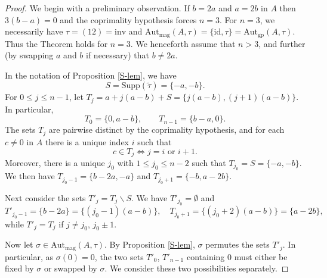 \documentclass[10pt,a4paper]{amsart}
\numberwithin{equation}{section}
\theoremstyle{definition}
\newcommand{\id}{\mathrm{id}}
\newcommand{\LRA}{\Leftrightarrow}
\newcommand{\inv}{\mathrm{inv}}
\newcommand{\Autgp}{\mathrm{Aut}_{\mathrm{gp}}}
\newcommand{\Autmag}{\mathrm{Aut}_\mathrm{mag}}
\newcommand{\ttau}{\tilde{\tau}}
\newcommand{\bs}{\backslash}
\newcommand{\Supp}{\mathrm{Supp}}
\begin{document}
\setcounter{section}{3}
\setcounter{equation}{1}
\setcounter{lemma}{2}
\begin{proof}

We begin with a preliminary observation. If $b=2a$ and $a=2b$ in $A$ then $3(b-a)=0$ and the coprimality hypothesis forces $n=3$. For $n=3$, we necessarily have $\tau=(12)=\inv$ and $\Autmag(A,\tau)=\{\id, \tau \}=\Autgp(A,\tau)$. Thus the Theorem holds for $n=3$. We henceforth assume that $n>3$, and further (by swapping $a$ and $b$ if necessary) that $b \neq 2a$. 

In the notation of Proposition \ref{S-lem}, we have 
$$ S= \Supp(\ttau)=	\{-a,-b\}. $$ 
For $0 \leq j \leq n-1$, let $T_j=a+j(a-b)+S = \{j(a-b), (j+1)(a-b)\}$. In particular, 
$$  	T_0 =  \{ 0, a-b\},  \qquad 	T_{n-1} = \{ b-a, 0 \}.  $$ 
The sets $T_j$ are pairwise distinct by the coprimality hypothesis, and for each $c \neq 0$ in $A$ there is a unique index $i$ such that 
$$ c \in T_j \LRA j=i \mbox{ or } i+1. $$ 
Moreover, there is a unique $j_0$ with $1 \leq j_0 \leq n-2$ such that $T_{j_0} = S= \{-a,-b\}$. We then have $T_{j_0-1} = \{b-2a, -a\}$ and $T_{j_0+1} = \{ -b, a-2b \}$. 

Next consider the sets $T'_j=T_j \bs S$. We have $T'_{j_0}= \emptyset$ and 
$$ T'_{j_0-1}=\{b-2a\}=\{(j_0-1)(a-b)\}, \quad T_{j_0+1} = \{(j_0+2)(a-b)\} = \{a-2b \}, $$ 
while $T'_j=T_j$ if $j \neq j_0$, $j_0 \pm 1$. 

Now let $\sigma \in \Autmag(A,\tau)$. By Proposition \ref{S-lem}, $\sigma$ permutes the sets $T'_j$. In particular, as $\sigma(0)=0$, the two sets $T'_0$, $T'_{n-1}$ containing $0$ must either be fixed by $\sigma$ or swapped by $\sigma$. 
We consider these two possibilities separately.
	

\end{proof}
\end{document}
